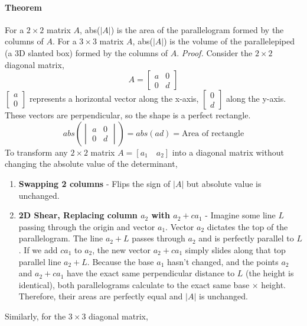 \documentclass[../linear-algebra.tex]{subfiles}
\begin{document}
\paragraph{Theorem} For a $2 \times 2$ matrix $A$, abs($|A|$) is the area of the parallelogram formed by the columns of $A$.\newline
For a $3 \times 3$ matrix $A$, abs($|A|$) is the volume of the parallelepiped (a 3D slanted box) formed by the columns of $A$.\newline
\textit{Proof.}\newline
Consider the $2 \times 2$ diagonal matrix,
\[A = \begin{bmatrix} a & 0 \\ 0 & d \end{bmatrix}\]
$\begin{bmatrix} a \\ 0 \end{bmatrix}$ represents a horizontal vector along the x-axis, $\begin{bmatrix} 0 \\ d \end{bmatrix}$ along the y-axis.
These vectors are perpendicular, so the shape is a perfect rectangle.
\[abs \left( \begin{vmatrix} a & 0 \\ 0 & d \end{vmatrix} \right) = abs(ad) = \text{Area of rectangle}\]
To transform any $2 \times 2$ matrix $A = [a_1\quad a_2]$ into a diagonal matrix without changing the absolute value of the determinant,
\begin{enumerate}
    \item \textbf{Swapping 2 columns} - Flips the sign of $|A|$ but absolute value is unchanged.
    \item \textbf{2D Shear, Replacing column $a_2$ with $a_2 + ca_1$} - Imagine some line $L$ passing through the origin and vector $a_1$.
    Vector $a_2$ dictates the top of the parallelogram. The line $a_2 + L$ passes through $a_2$ and is perfectly parallel to $L$.
    If we add $ca_1$ to $a_2$, the new vector $a_2 + ca_1$ simply slides along that top parallel line $a_2 + L$.
    Because the base $a_1$ hasn't changed, and the points $a_2$ and $a_2 + ca_1$ have the exact same perpendicular distance to $L$ (the height is identical), both parallelograms calculate to the exact same base $\times$ height.
    Therefore, their areas are perfectly equal and $|A|$ is unchanged.
\end{enumerate}
Similarly, for the $3\times 3$ diagonal matrix,
\end{document}
